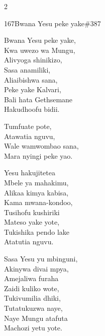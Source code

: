 \begin{multicols}{2}
\begin{hymn}{167}{Bwana Yesu peke yake}{\#387}
\begin{stanza}
Bwana Yesu peke yake,\\
Kwa uwezo wa Mungu,\\
Alivyoga shinikizo,\\
Sasa anamiliki,\\
Aliaibishwa sana,\\
Peke yake Kalvari,\\
Bali hata Gethsemane\\
Hakudhoofu bidii.
\end{stanza}
\begin{chorus}
Tumfuate pote,\\
Atawatia nguvu,\\
Wale wamwombao sana,\\
Mara nyingi peke yao.
\end{chorus}
\begin{stanza}
Yesu hakujitetea\\
Mbele ya mahakimu,\\
Alikaa kimya kabisa,\\
Kama mwana-kondoo,\\
Tusihofu kushiriki\\
Mateso yake yote,\\
Tukishika pendo lake\\
Atatutia nguvu.
\end{stanza}
\begin{stanza}
Sasa Yesu yu mbinguni,\\
Akinywa divai mpya,\\
Amejaliwa furaha\\
Zaidi kuliko wote,\\
Tukivumilia dhiki,\\
Tutatukuzwa naye,\\
Naye Mungu atafuta\\
Machozi yetu yote.
\end{stanza}
\end{hymn}


\end{multicols}
